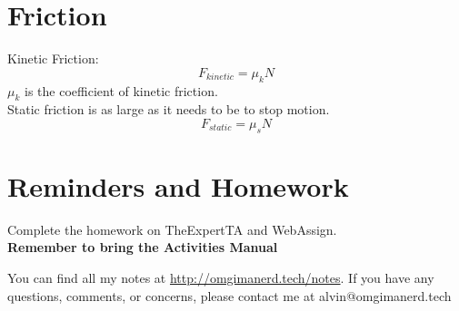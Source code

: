 \documentclass[letterpaper, 12pt]{math}
\begin{document}
\section*{Friction}
Kinetic Friction:
\[ F_{kinetic} = \mu_kN \]
\( \mu_k \) is the coefficient of kinetic friction. \\
Static friction is as large as it needs to be to stop motion.
\[ F_{static} = \mu_sN \]

\section*{Reminders and Homework}
Complete the homework on TheExpertTA and WebAssign. \\
\textbf{Remember to bring the Activities Manual}

\begin{center}
  You can find all my notes at \url{http://omgimanerd.tech/notes}. If you have
  any questions, comments, or concerns, please contact me at
  alvin@omgimanerd.tech
\end{center}
\end{document}

